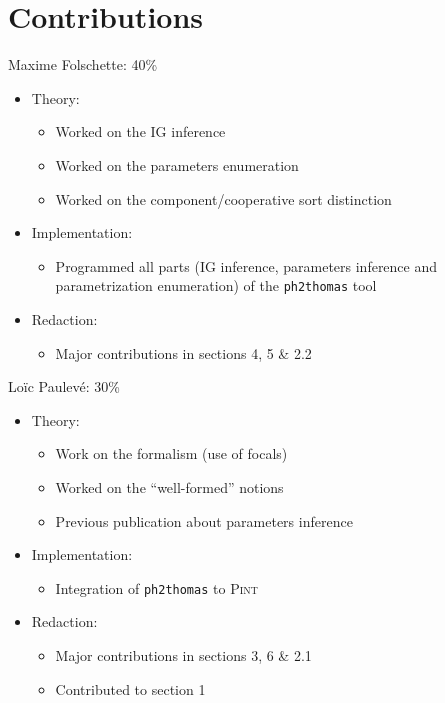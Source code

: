 \section{Contributions}

\noindent
Maxime Folschette: 40\%
\begin{itemize}
  \item Theory:
  \begin{itemize}
    \item Worked on the IG inference
    \item Worked on the parameters enumeration
    \item Worked on the component/cooperative sort distinction
  \end{itemize}
  \item Implementation:
  \begin{itemize}
    \item Programmed all parts (IG inference, parameters inference and parametrization enumeration) of the \texttt{ph2thomas} tool
  \end{itemize}
  \item Redaction:
  \begin{itemize}
    \item Major contributions in sections 4, 5 \& 2.2
  \end{itemize}
\end{itemize}

\noindent
Loïc Paulevé: 30\%
\begin{itemize}
  \item Theory:
  \begin{itemize}
    \item Work on the formalism (use of focals)
    \item Worked on the “well-formed” notions
    \item Previous publication about parameters inference
  \end{itemize}
  \item Implementation:
  \begin{itemize}
    \item Integration of \texttt{ph2thomas} to \textsc{Pint}
  \end{itemize}
  \item Redaction:
  \begin{itemize}
    \item Major contributions in sections 3, 6 \& 2.1
    \item Contributed to section 1
  \end{itemize}
\end{itemize}

